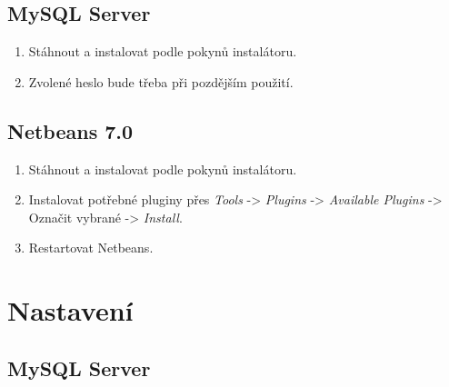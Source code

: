 \documentclass[11pt,twoside,a4paper]{book}
\begin{document}
\subsection{MySQL Server}

\begin{enumerate}
	\item Stáhnout a instalovat podle pokynů instalátoru.
	\item Zvolené heslo bude třeba při pozdějším použití.
\end{enumerate}

\subsection{Netbeans 7.0}

\begin{enumerate}
	\item Stáhnout a instalovat podle pokynů instalátoru.
	\item Instalovat potřebné pluginy přes \textit{Tools} -> \textit{Plugins} -> \textit{Available Plugins} -> Označit vybrané -> \textit{Install}.
	\item Restartovat Netbeans. 
\end{enumerate}

\section{Nastavení}

\subsection{MySQL Server}
\end{document}
